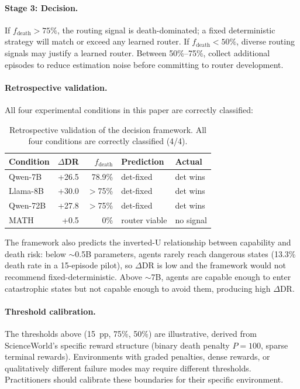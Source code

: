\documentclass[11pt]{article}
\begin{document}
\paragraph{Stage 3: Decision.}
If $f_{\text{death}} > 75\%$, the routing signal is death-dominated; a fixed deterministic strategy will match or exceed any learned router. If $f_{\text{death}} < 50\%$, diverse routing signals may justify a learned router. Between 50\%--75\%, collect additional episodes to reduce estimation noise before committing to router development.

\paragraph{Retrospective validation.}
All four experimental conditions in this paper are correctly classified:

\begin{table}[h]
\centering
\small
\begin{tabular}{@{}lrrll@{}}
\toprule
Condition & $\Delta$DR & $f_{\text{death}}$ & Prediction & Actual \\
\midrule
Qwen-7B & +26.5 & 78.9\% & det-fixed & det wins \\
Llama-8B & +30.0 & $>$75\% & det-fixed & det wins \\
Qwen-72B & +27.8 & $>$75\% & det-fixed & det wins \\
MATH & +0.5 & 0\% & router viable & no signal \\
\bottomrule
\end{tabular}
\caption{Retrospective validation of the decision framework. All four conditions are correctly classified (4/4).}
\label{tab:decision-framework}
\end{table}

The framework also predicts the inverted-U relationship between capability and death risk: below ${\sim}$0.5B parameters, agents rarely reach dangerous states (13.3\% death rate in a 15-episode pilot), so $\Delta\text{DR}$ is low and the framework would not recommend fixed-deterministic. Above ${\sim}$7B, agents are capable enough to enter catastrophic states but not capable enough to avoid them, producing high $\Delta\text{DR}$.

\paragraph{Threshold calibration.} The thresholds above (15~pp, 75\%, 50\%) are illustrative, derived from ScienceWorld's specific reward structure (binary death penalty $P{=}100$, sparse terminal rewards). Environments with graded penalties, dense rewards, or qualitatively different failure modes may require different thresholds. Practitioners should calibrate these boundaries for their specific environment.
\end{document}

